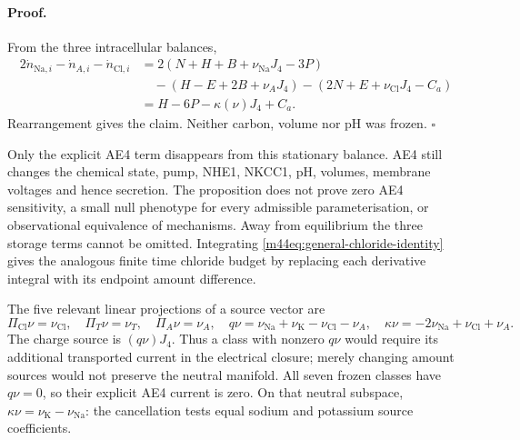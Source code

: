 \paragraph{Proof.}
From the three intracellular balances,
\begin{align*}
 2\dot n_{\mathrm{Na},i}-\dot n_{A,i}-\dot n_{\mathrm{Cl},i}
 &=2(N+H+B+\nu_{\mathrm{Na}}J_4-3P)\\
 &\quad -(H-E+2B+\nu_AJ_4)
             -(2N+E+\nu_{\mathrm{Cl}}J_4-C_a)\\
 &=H-6P-\kappa(\nu)J_4+C_a.
\end{align*}
Rearrangement gives the claim.  Neither carbon, volume nor pH was frozen.
$\square$

Only the explicit AE4 term disappears from this stationary balance.
AE4 still changes the chemical state, pump, NHE1, NKCC1, pH, volumes,
membrane voltages and hence secretion.  The proposition does not prove
zero AE4 sensitivity, a small null phenotype for every admissible
parameterisation, or observational equivalence of mechanisms.  Away from
equilibrium the three storage terms cannot be omitted.  Integrating
\eqref{m44eq:general-chloride-identity} gives the analogous finite time
chloride budget by replacing each derivative integral with its endpoint
amount difference.

The five relevant linear projections of a source vector are
\[
 \Pi_{\mathrm{Cl}}\nu=\nu_{\mathrm{Cl}},\quad
 \Pi_T\nu=\nu_T,\quad \Pi_A\nu=\nu_A,\quad
 q\nu=\nu_{\mathrm{Na}}+\nu_{\mathrm K}-\nu_{\mathrm{Cl}}-\nu_A,
 \quad \kappa\nu=-2\nu_{\mathrm{Na}}+\nu_{\mathrm{Cl}}+\nu_A.
\]
The charge source is $(q\nu)J_4$.  Thus a class with nonzero $q\nu$ would
require its additional transported current in the electrical closure;
merely changing amount sources would not preserve the neutral manifold.
All seven frozen classes have $q\nu=0$, so their explicit AE4 current is
zero.  On that neutral subspace,
$\kappa\nu=\nu_{\mathrm K}-\nu_{\mathrm{Na}}$: the cancellation tests
equal sodium and potassium source coefficients.

